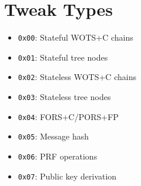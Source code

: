 \section{Tweak Types}

\begin{itemize}
    \item[] \texttt{0x00}: Stateful WOTS+C chains
    \item[] \texttt{0x01}: Stateful tree nodes
    \item[] \texttt{0x02}: Stateless WOTS+C chains
    \item[] \texttt{0x03}: Stateless tree nodes
    \item[] \texttt{0x04}: FORS+C/PORS+FP
    \item[] \texttt{0x05}: Message hash
    \item[] \texttt{0x06}: PRF operations
    \item[] \texttt{0x07}: Public key derivation 
\end{itemize}